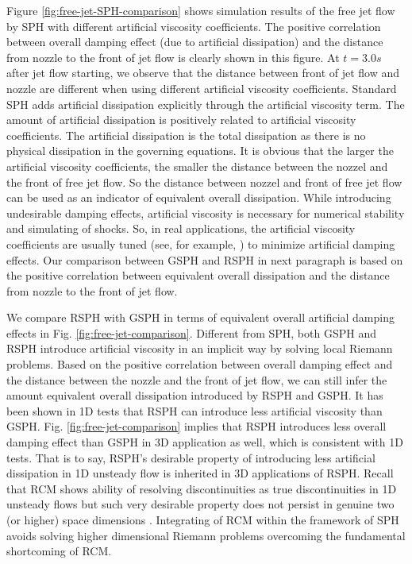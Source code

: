 \documentclass[review]{elsarticle}
\begin{document}
Figure \ref{fig:free-jet-SPH-comparison} shows simulation results of the free jet flow by SPH with different artificial viscosity coefficients. The positive correlation between overall damping effect (due to artificial dissipation) and the distance from nozzle to the front of jet flow is clearly shown in this figure. At $t=3.0 s$ after jet flow starting, we observe that the distance between front of jet flow and nozzle are different when using different artificial viscosity coefficients. Standard SPH adds artificial dissipation explicitly through the artificial viscosity term. The amount of artificial dissipation is positively related to artificial viscosity coefficients. The artificial dissipation is the total dissipation as there is no physical dissipation in the governing equations. It is obvious that the larger the artificial viscosity coefficients, the smaller the distance between the nozzel and the front of free jet flow. So the distance between nozzel and front of free jet flow can be used as an indicator of equivalent overall dissipation.
While introducing undesirable damping effects, artificial viscosity is necessary for numerical stability and simulating of shocks. So, in real applications, the artificial viscosity coefficients are usually tuned (see, for example, \citep{cao2018plume}) to minimize artificial damping effects.
Our comparison between GSPH and RSPH in next paragraph is based on the positive correlation between equivalent overall dissipation and the distance from nozzle to the front of jet flow.

We compare RSPH with GSPH in terms of equivalent overall artificial damping effects in Fig. \ref{fig:free-jet-comparison}. Different from SPH, both GSPH and RSPH introduce artificial viscosity in an implicit way by solving local Riemann problems. Based on the positive correlation between overall damping effect and the distance between the nozzle and the front of jet flow, we can still infer the amount equivalent overall dissipation introduced by RSPH and GSPH. It has been shown in 1D tests that RSPH can introduce less artificial viscosity than GSPH. Fig. \ref{fig:free-jet-comparison} implies that RSPH introduces less overall damping effect than GSPH in 3D application as well, which is consistent with 1D tests. That is to say, RSPH's desirable property of introducing less artificial dissipation in 1D unsteady flow is inherited in 3D applications of RSPH. Recall that RCM shows ability of resolving discontinuities as true discontinuities in 1D unsteady flows but such very desirable property does not persist in genuine two (or higher) space dimensions \citep{colella1982glimm}. Integrating of RCM within the framework of SPH avoids solving higher dimensional Riemann problems overcoming the fundamental shortcoming of RCM.
\end{document}
